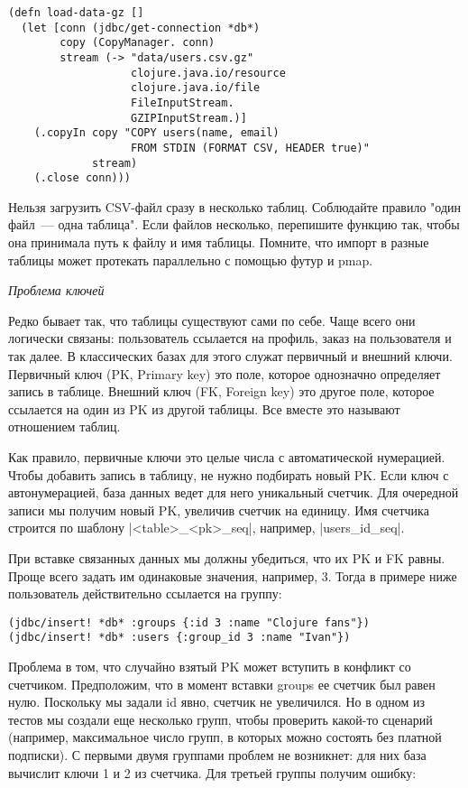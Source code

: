 \begin{verbatim}
(defn load-data-gz []
  (let [conn (jdbc/get-connection *db*)
        copy (CopyManager. conn)
        stream (-> "data/users.csv.gz"
                   clojure.java.io/resource
                   clojure.java.io/file
                   FileInputStream.
                   GZIPInputStream.)]
    (.copyIn copy "COPY users(name, email)
                   FROM STDIN (FORMAT CSV, HEADER true)"
             stream)
    (.close conn)))
\end{verbatim}

Нельзя загрузить CSV-файл сразу в несколько таблиц. Соблюдайте правило "один
файл~--- одна таблица". Если файлов несколько, перепишите функцию так, чтобы она
принимала путь к файлу и имя таблицы. Помните, что импорт в разные таблицы может
протекать параллельно с помощью футур и pmap.

\emph{Проблема ключей}

Редко бывает так, что таблицы существуют сами по себе. Чаще всего они логически
связаны: пользователь ссылается на профиль, заказ на пользователя и так далее. В
классических базах для этого служат первичный и внешний ключи. Первичный ключ
(PK, Primary key) это поле, которое однозначно определяет запись в
таблице. Внешний ключ (FK, Foreign key) это другое поле, которое ссылается на
один из PK из другой таблицы. Все вместе это называют отношением таблиц.

Как правило, первичные ключи это целые числа с автоматической нумерацией. Чтобы
добавить запись в таблицу, не нужно подбирать новый PK. Если ключ с
автонумерацией, база данных ведет для него уникальный счетчик. Для очередной
записи мы получим новый PK, увеличив счетчик на единицу. Имя счетчика строится
по шаблону \spverb|<table>_<pk>_seq|, например, \spverb|users_id_seq|.

При вставке связанных данных мы должны убедиться, что их PK и FK равны. Проще
всего задать им одинаковые значения, например, 3. Тогда в примере ниже
пользователь действительно ссылается на группу:

\begin{verbatim}
(jdbc/insert! *db* :groups {:id 3 :name "Clojure fans"})
(jdbc/insert! *db* :users {:group_id 3 :name "Ivan"})
\end{verbatim}

Проблема в том, что случайно взятый PK может вступить в конфликт со
счетчиком. Предположим, что в момент вставки groups ее счетчик был равен
нулю. Поскольку мы задали id явно, счетчик не увеличился. Но в одном из тестов
мы создали еще несколько групп, чтобы проверить какой-то сценарий (например,
максимальное число групп, в которых можно состоять без платной подписки). С
первыми двумя группами проблем не возникнет: для них база вычислит ключи 1 и 2
из счетчика. Для третьей группы получим ошибку:

